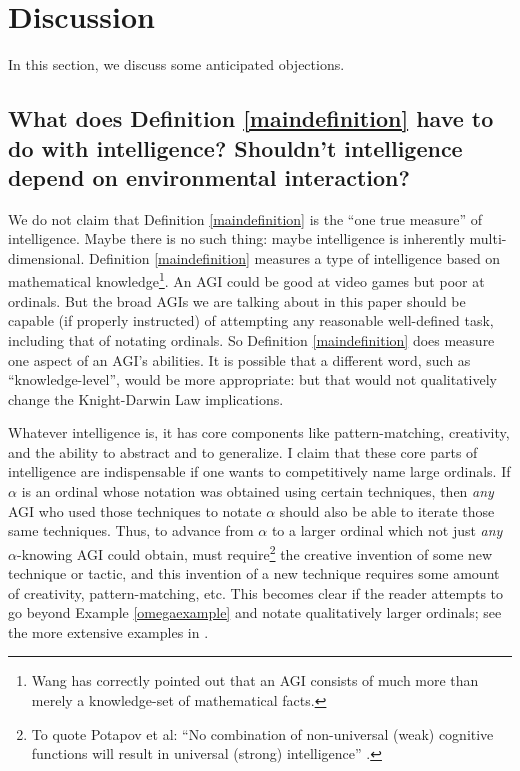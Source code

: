 \documentclass[runningheads]{llncs}
\begin{document}
\section{Discussion}
\label{objectionsection}

In this section, we discuss some anticipated objections.

\subsection{What does Definition \ref{maindefinition} have to do with intelligence?
Shouldn't intelligence depend on environmental interaction?}

We do not claim that Definition \ref{maindefinition} is the ``one true measure'' of
intelligence. Maybe there is no such thing: maybe intelligence is inherently
multi-dimensional. Definition \ref{maindefinition} measures a type of
intelligence based on mathematical knowledge\footnote{Wang has
correctly pointed out \cite{wang2007} that an AGI consists of much more than merely
a knowledge-set of mathematical facts.}. An AGI could be good at video games
but poor at ordinals. But the broad AGIs we are talking about in this paper
should be capable (if properly
instructed) of attempting any reasonable well-defined task, including that of
notating ordinals. So Definition \ref{maindefinition} does
measure one aspect of an AGI's abilities. It is possible that
a different word, such as
``knowledge-level'', would be more appropriate: but
that would not qualitatively change
the Knight-Darwin Law implications.

Whatever intelligence is, it has core components like pattern-matching,
creativity, and the ability to abstract and to generalize.
I claim that these core parts of intelligence are indispensable if one wants to
competitively name large ordinals. If $\alpha$ is an ordinal whose
notation was obtained using certain techniques, then \emph{any} AGI who used those
techniques to notate $\alpha$ should also be able to iterate those same techniques.
Thus, to advance from
$\alpha$ to a larger ordinal which not just \emph{any} $\alpha$-knowing
AGI could obtain, must require\footnote{To quote Potapov et al: ``No combination of
non-universal (weak) cognitive functions will result in universal
(strong) intelligence'' \cite{potapov2012cognitive}.}
the creative invention of some new technique or tactic, and
this invention of a new technique requires some amount of creativity,
pattern-matching, etc. This becomes clear if the reader attempts to
go beyond Example \ref{omegaexample} and notate qualitatively larger ordinals;
see the more extensive examples in \cite{github}.
\end{document}
